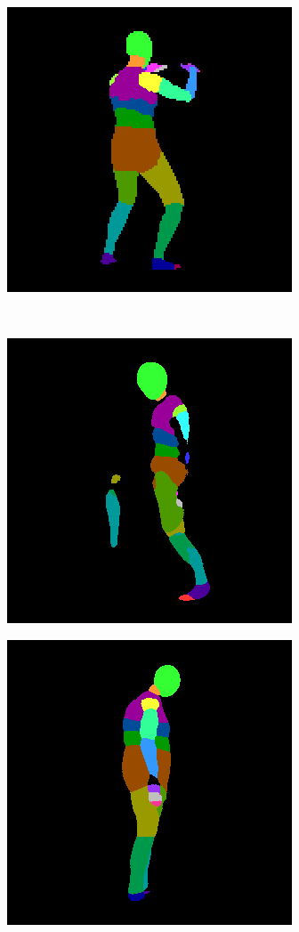 \begin{figure}
\begin{subfigure}{.19\textwidth}
\end{subfigure}
\begin{subfigure}{.19\textwidth}
  \centering
  \includegraphics[scale=0.3]{ung_133_25_c0001_segm_29.png}\\
\end{subfigure}\\
\begin{subfigure}{.198\textwidth}
\centering
  \includegraphics[scale=0.295]{36_04_c0001_segm_30_seg.png}
\end{subfigure}%
\begin{subfigure}{.19\textwidth}
  \centering
  \includegraphics[scale=0.295]{36_16_c0002_segm_34_seg.png}

\end{subfigure}
\end{figure}
